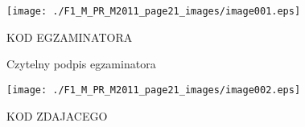 \documentclass[a4paper,12pt]{article}
\begin{document}
\begin{center}
\texttt{[image: ./F1\_M\_PR\_M2011\_page21\_images/image001.eps]}
\end{center}
KOD EGZAMINATORA

Czytelny podpis egzaminatora
\begin{center}
\texttt{[image: ./F1\_M\_PR\_M2011\_page21\_images/image002.eps]}
\end{center}
KOD ZDAJACEGO
\end{document}
